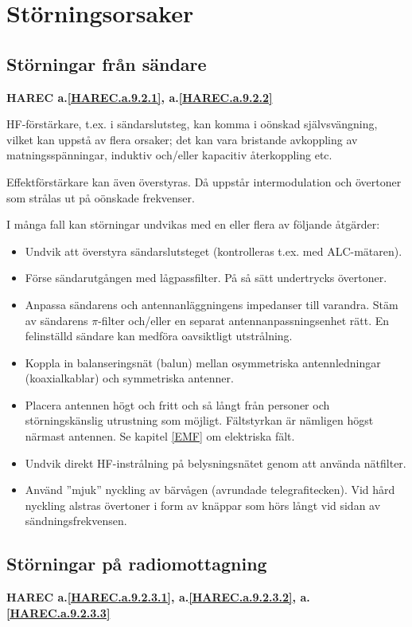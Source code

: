 \section{Störningsorsaker}

\subsection{Störningar från sändare}
\textbf{
HAREC a.\ref{HAREC.a.9.2.1}\label{myHAREC.a.9.2.1},
 a.\ref{HAREC.a.9.2.2}\label{myHAREC.a.9.2.2}
}

HF-förstärkare, t.ex. i sändarslutsteg, kan komma i oönskad självsvängning,
vilket kan uppstå av flera orsaker; det kan vara bristande avkoppling av
matningsspänningar, induktiv och/eller kapacitiv återkoppling etc.

Effektförstärkare kan även överstyras.
Då uppstår intermodulation och övertoner som strålas ut på oönskade frekvenser.

I många fall kan störningar undvikas med en eller flera av följande åtgärder:
\begin{itemize}
\item Undvik att överstyra sändarslutsteget (kontrolleras t.ex. med
  ALC-mätaren).
\item Förse sändarutgången med lågpassfilter.
  På så sätt undertrycks övertoner.
\item Anpassa sändarens och antennanläggningens impedanser till varandra.
  Stäm av sändarens \(\pi\)-filter och/eller en separat antennanpassningsenhet
  rätt.
  En felinställd sändare kan medföra oavsiktligt utstrålning.
\item Koppla in balanseringsnät (balun) mellan osymmetriska antennledningar
  (koaxialkablar) och symmetriska antenner.
\item Placera antennen högt och fritt och så långt från personer och
  störningskänslig utrustning som möjligt.
  Fältstyrkan är nämligen högst närmast antennen.
  Se kapitel \ref{EMF} om elektriska fält.
\item Undvik direkt HF-instrålning på belysningsnätet genom att använda
  nätfilter.
\item Använd ''mjuk'' nyckling av bärvågen (avrundade telegrafitecken).
  Vid hård nyckling alstras övertoner i form av knäppar som hörs långt vid
  sidan av sändningsfrekvensen.
\end{itemize}

\subsection{Störningar på radiomottagning}
\textbf{
HAREC a.\ref{HAREC.a.9.2.3.1}\label{myHAREC.a.9.2.3.1},
 a.\ref{HAREC.a.9.2.3.2}\label{myHAREC.a.9.2.3.2},
 a.\ref{HAREC.a.9.2.3.3}\label{myHAREC.a.9.2.3.3}
}

